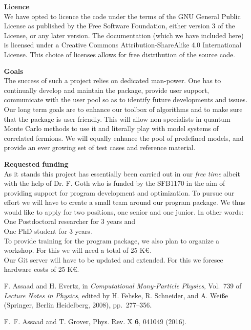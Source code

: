 \documentclass[12pt]{article}
\begin{document}
{\bf Licence} \\ 
We have opted to licence the code under  the terms of the GNU General Public License as published by
the Free Software Foundation, either version 3 of the License, or any later version.   The documentation (which we have included here)  is licensed under a Creative Commons Attribution-ShareAlike 4.0 International License.  This choice of licenses allows for free distribution of the source code. 


 
{\bf Goals } \\
The success of such a project relies on dedicated man-power. One has to continually develop and  maintain the package, provide user support, communicate with the user pool so as to identify  future developments and issues.   Our long term  goals  are  to enhance  our toolbox of algorithms  and to  make sure that the package is user friendly. This will allow  non-specialists  in quantum Monte Carlo methods to  use it and literally play with model systems of correlated fermions.  We will equally  enhance the pool of predefined models, and provide an ever growing set of test cases and reference material. 

{\bf Requested funding } \\
As it stands this project has essentially been carried out in our {\it free time}  albeit with the help of  Dr. F. Goth who is funded by the SFB1170   in the aim of providing support for program development and optimization. To pursue our effort we will have to create a small team around our program package. We thus would like to apply for two positions, one senior and one junior. In other words: \\ 

One Postdoctoral researcher for 3 years  and \\
One PhD student for 3 years. \\

To provide training for the program package, we also plan to organize a workshop. For this we  will need a total of 25 K\euro.  \\

Our Git server will have to be updated  and extended. For this we foresee hardware costs of  25 K\euro. \\



% 
% 
%
\small 
\begin{thebibliography}{1}

F. Assaad and H. Evertz,  in {\em Computational Many-Particle Physics},
  Vol.~739 of {\em Lecture Notes in Physics}, edited by H. Fehske, R.
  Schneider, and A. Wei{\ss}e (Springer, Berlin Heidelberg, 2008), pp.\
  277--356.

F.~F. Assaad and T. Grover, Phys. Rev. X {\bf 6},  041049  (2016).

\end{thebibliography}
\normalsize
\end{document}
